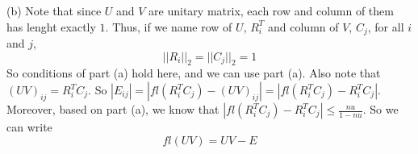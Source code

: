 \documentclass[12pt]{article}
\begin{document}
\begin{enumerate}[leftmargin=\labelsep]
(b) Note that since $U$ and $V$ are unitary matrix, each row and column of them has lenght exactly $1$. Thus, if we name row of $U$, $R_i^T$ and column of $V$, $C_j$, for all $i$ and $j$, $$||R_i||_2=||C_j||_2 = 1$$
So conditions of part (a) hold here, and we can use part (a). Also note that $(UV)_{ij} = R_i^T C_j$. So $|E_{ij}| = |fl(R_i^TC_j)-(UV)_{ij}| = |fl(R_i^TC_j)-R_i^T C_j|$. Moreover, based on part (a), we know that $|fl(R_i^TC_j)-R_i^T C_j| \leq \frac{nu}{1 - nu}$.
So we can write 
$$fl(UV) = UV - E$$
\end{enumerate}
\end{document}
